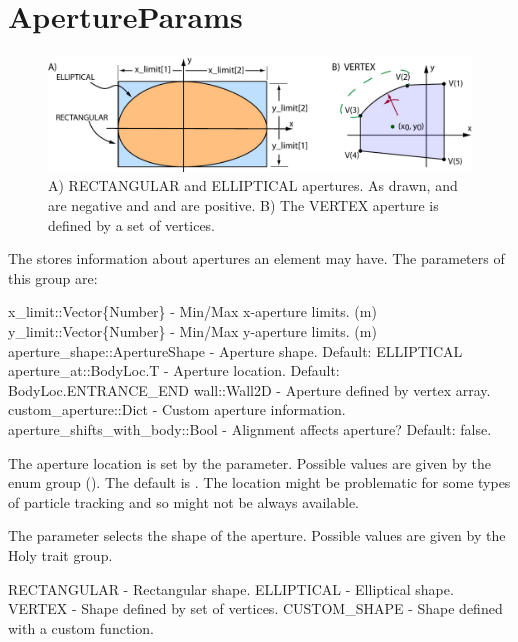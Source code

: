\section{ApertureParams}
\label{s:aperture.g}

\begin{figure}[bt]
\centering \includegraphics{apertures.pdf} \caption[Apertures.]  
{
A) RECTANGULAR and ELLIPTICAL apertures. As drawn,  and  are 
negative and  and  are positive. B) The VERTEX aperture is defined
by a set of vertices.
}  \label{f:apertures}
\end{figure}

The  stores information about apertures an element may have. 
The parameters of this group are:
\begin{example}
  x_limit::Vector\{Number\}     - Min/Max x-aperture limits. (m)
  y_limit::Vector\{Number\}     - Min/Max y-aperture limits. (m)
  aperture_shape::ApertureShape - Aperture shape. Default: ELLIPTICAL
  aperture_at::BodyLoc.T        - Aperture location. Default: BodyLoc.ENTRANCE_END
  wall::Wall2D                  - Aperture defined by vertex array.
  custom_aperture::Dict         - Custom aperture information.
  aperture_shifts_with_body::Bool 
                                - Alignment affects aperture? Default: false.
\end{example}

The aperture location is set by the  parameter. Possible values are
given by the  enum group (). The default is .
The  location might be problematic for some types of particle tracking and
so might not be always available.

The  parameter selects the shape of the aperture. Possible values are
given by the  Holy trait group. 
\begin{example}
  RECTANGULAR   - Rectangular shape.
  ELLIPTICAL    - Elliptical shape.
  VERTEX        - Shape defined by set of vertices.
  CUSTOM_SHAPE  - Shape defined with a custom function.
\end{example}

